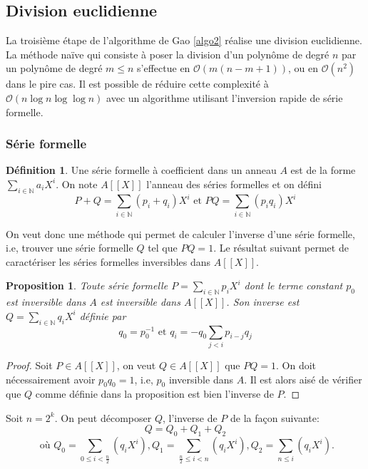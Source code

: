 \documentclass{article}
\newtheorem{proposition}{Proposition}
\theoremstyle{definition}
\newtheorem{definition}{Définition}
\theoremstyle{remark}
\begin{document}
\subsection{Division euclidienne}

La troisième étape de l'algorithme de Gao \ref{algo2} réalise une division euclidienne. La méthode naïve qui consiste à poser la division d'un polynôme de degré $n$ par un polynôme de degré $m \le n$ s'effectue en $\mathcal{O}(m(n-m+1))$, ou en $\mathcal{O}(n^2)$ dans le pire cas. Il est possible de réduire cette complexité à $\mathcal{O}(n\log{}n\log{}\log{}n)$ avec un algorithme utilisant l'inversion rapide de série formelle.

\subsubsection{Série formelle}

\begin{definition}
    Une série formelle à coefficient dans un anneau $A$ est de la forme $\sum_{i \in \mathbb{N}} a_i X^i$.
    On note $A[[X]]$ l'anneau des séries formelles et on défini
    \[ P + Q = \sum_{i \in \mathbb{N}} (p_i + q_i) X^i \text{ et } PQ = \sum_{i \in \mathbb{N}} (p_i q_i) X^i\]
\end{definition}

On veut donc une méthode qui permet de calculer l'inverse d'une série formelle, i.e, trouver une série formelle $Q$ tel que $PQ = 1$. Le résultat suivant permet de caractériser les séries formelles inversibles dans $A[[X]]$.

\begin{proposition}
    Toute série formelle $P = \sum_{i \in \mathbb{N}} p_i X^i$ dont le terme constant $p_0$ est inversible dans $A$ est inversible dans $A[[X]]$. Son inverse est $Q = \sum_{i \in \mathbb{N}} q_i X^i$ définie par
    \[ q_0 = p_0^{-1} \text{ et } q_i = -q_0 \sum_{j<i} p_{i-j}q_j \]
\end{proposition}

\begin{proof}
    Soit $P \in A[[X]]$, on veut $Q \in A[[X]]$ que $PQ = 1$. On doit nécessairement avoir $p_0q_0 = 1$, i.e, $p_0$ inversible dans $A$. Il est alors aisé de vérifier que $Q$ comme définie dans la proposition est bien l'inverse de $P$.
\end{proof}

Soit $n=2^k$. On peut décomposer $Q$, l'inverse de $P$ de la façon suivante:
\[Q=Q_0 + Q_1 + Q_2\]
\[ \text{ où } Q_0 = \sum_{0 \le i < \frac{n}{2}}(q_i X^i) , Q_1 = \sum_{\frac{n}{2} \le i < n}(q_i X^i) , Q_2 = \sum_{n \le i}(q_i X^i). \]
\end{document}
